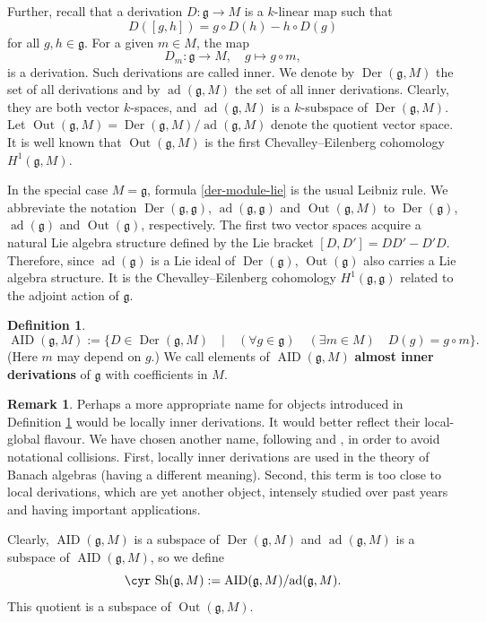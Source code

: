 \documentclass[11pt,reqno]{amsart}
\numberwithin{equation}{section}
\theoremstyle{definition}
\newtheorem{definition}[theorem]{Definition}
\newtheorem{remark}[theorem]{Remark}
\newcommand{\Out}{{\operatorname{ Out}}}
\newcommand{\AID}{{\operatorname{ AID}}}
\newcommand{\Der}{{\operatorname{ Der}}}
\newcommand{\ad}{{\operatorname{ ad}}}
\def\Sha{\text{\cyr Sh}}
\def\g{\mathfrak g}
\begin{document}
Further, recall that a derivation $D\colon \g\to M$ is a $k$-linear map
such that
\begin{equation} \label{der-module-lie}
D([g,h])=g\circ D(h) - h\circ D(g)
\end{equation}
for all $g,h\in \g$. For a given $m\in M$, the map
$$
D_m\colon \g\to M, \quad g\mapsto g\circ m,
$$
is a derivation. Such derivations are called inner. We denote by
$\Der (\g,M)$ the set of all derivations and by $\ad (\g,M)$ the
set of all inner derivations. Clearly, they are both vector $k$-spaces,
and $\ad (\g ,M)$ is a $k$-subspace of $\Der (\g,M)$. Let $\Out (\g ,M)=\Der (\g,M)/\ad (\g,M)$
denote the quotient vector space. It is well known that $\Out (\g ,M)$ is the first
Chevalley--Eilenberg cohomology $H^1(\g,M)$.

In the special case
$M=\g$,  formula \eqref{der-module-lie} is the usual Leibniz rule.
We abbreviate the notation $\Der (\g,\g)$, $\ad (\g,\g)$ and $\Out (\g ,M)$ to
$\Der (\g)$, $\ad (\g)$ and $\Out (\g )$, respectively. The first two vector spaces acquire a natural Lie algebra
structure defined by the Lie bracket $[D,D']=DD'-D'D$. Therefore, since $\ad (\g)$ is a Lie ideal
of $\Der (\g )$, $\Out (\g )$ also carries a Lie algebra structure. It is
the Chevalley--Eilenberg cohomology $H^1(\g,\g)$ related to the adjoint action of $\g$.

\begin{definition} \label{def:lid-lie}
$$
\AID (\g,M):= \{D\in \Der (\g,M) \quad | \quad (\forall g\in \g) \quad  (\exists m\in M) \quad D(g)=g\circ m\}.
$$
(Here $m$ may depend on $g$.) We call elements of $\AID (\g,M)$ {\bf{almost inner derivations}}
of $\g$ with coefficients in $M$.
\end{definition}

\begin{remark}
Perhaps a more appropriate name for objects introduced in Definition \ref{def:lid-lie} would be locally inner derivations.
It would better reflect their local-global flavour. We have chosen another name, following \cite{GW} and \cite{BDV1},
in order to avoid notational collisions. First, locally inner derivations are used in the theory of Banach algebras (having a different
meaning). Second, this term is too close to local derivations, which are yet another object, intensely studied
over past years and having important applications. %
\end{remark}


Clearly, $\AID (\g,M)$ is a subspace of $\Der (\g ,M)$ and $\ad (\g,M)$ is a subspace of $\AID (\g,M)$,
so we define
$$
\Sha (\g,M):=\AID (\g,M)/\ad (\g ,M).
$$
This quotient is a subspace of $\Out (\g,M)$.
\end{document}
